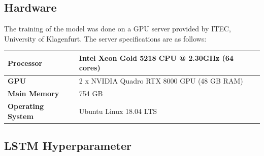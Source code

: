   \subsection{Hardware}
  \label{sec:hardware}

    The training of the  model was done on a GPU server provided by ITEC, University of Klagenfurt. The server specifications are as follows:

    \begin{center}
      \begin{tabular}{| l | l |}
        \hline
        \textbf{Processor}   &   Intel Xeon Gold 5218 CPU @ 2.30GHz (64 cores) \\ \hline
        \textbf{GPU}         &   2 x NVIDIA Quadro RTX 8000 GPU (48 GB RAM)    \\ \hline
        \textbf{Main Memory} &   754 GB                                        \\ \hline
        \textbf{Operating System} &  Ubuntu Linux 18.04 LTS                    \\ \hline

        \hline
      \end{tabular}
    \end{center}



  \subsection{LSTM Hyperparameter}
  \label{sec:lstm-hyperparameters-evaluation-setup}

